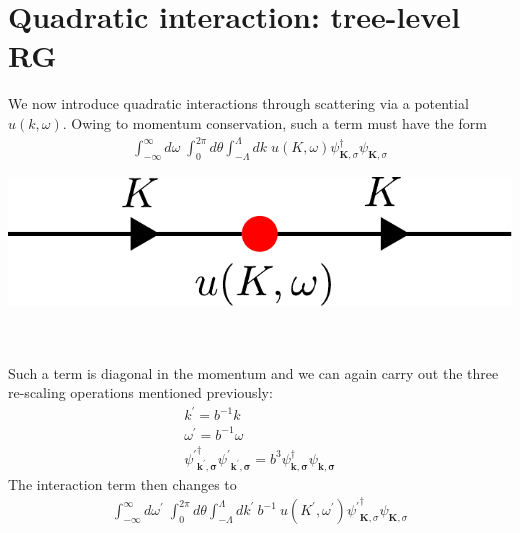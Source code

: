 \documentclass[14pt]{extarticle}
\begin{document}
\section{Quadratic interaction: tree-level RG}
\begin{minipage}{0.55\textwidth}
We now introduce quadratic interactions through scattering via a potential \(u(k,\omega)\). Owing to momentum conservation, such a term must have the form
\begin{equation}\begin{aligned}
	\int_{-\infty}^\infty d\omega\;\int_0^{2\pi} d\theta \int_{-\Lambda}^{\Lambda}dk \;u(K,\omega)\psi_{\mathbf{K},\sigma}^\dagger\psi_{\mathbf{K},\sigma}
\end{aligned}\end{equation}
\end{minipage}
\hspace*{\fill}
\begin{minipage}{0.4\textwidth}
	\centering
	\includegraphics[width=\textwidth]{./figures/tree_quadratic.pdf}
\end{minipage}
\\\\
Such a term is diagonal in the momentum and we can again carry out the three re-scaling operations mentioned previously:
\begin{gather}
	k^\prime = b^{-1} k\\
	\omega^\prime = b^{-1} \omega\\
{\psi^\prime}^\dagger_\mathbf{k^\prime,\sigma}{\psi^\prime}_\mathbf{k^\prime,\sigma} = b^{3}\psi^\dagger_\mathbf{k,\sigma}\psi_\mathbf{k,\sigma}
\end{gather}
The interaction term then changes to
\begin{equation}\begin{aligned}
	\int_{-\infty}^\infty d\omega^\prime\;\int_0^{2\pi} d\theta \int_{-\Lambda}^{\Lambda}dk^\prime ~ b^{-1} ~ u(K^\prime,\omega^\prime){\psi^\prime}_{\mathbf{K},\sigma}^\dagger\psi_{\mathbf{K},\sigma}
\end{aligned}\end{equation}
\end{document}
